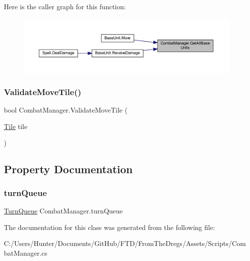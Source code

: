 Here is the caller graph for this function\+:
\nopagebreak
\begin{figure}[H]
\begin{center}
\leavevmode
\includegraphics[width=350pt]{class_combat_manager_a02eb44e3f4fab4f210d4ecda54fa1272_icgraph}
\end{center}
\end{figure}
\mbox{\label{class_combat_manager_a6f648795292255b600e92eefcf960ded}} 
\subsubsection{\texorpdfstring{ValidateMoveTile()}{ValidateMoveTile()}}
{\footnotesize\ttfamily bool Combat\+Manager.\+Validate\+Move\+Tile (\begin{DoxyParamCaption}\item[{\mbox{\hyperlink{class_tile}{Tile}}}]{tile }\end{DoxyParamCaption})}



\subsection{Property Documentation}
\mbox{\label{class_combat_manager_a6316ac49fbaf2e16426313d12749761d}} 
\subsubsection{\texorpdfstring{turnQueue}{turnQueue}}
{\footnotesize\ttfamily \mbox{\hyperlink{class_turn_queue}{Turn\+Queue}} Combat\+Manager.\+turn\+Queue\hspace{0.3cm}{\ttfamily [get]}}



The documentation for this class was generated from the following file\+:\begin{DoxyCompactItemize}
\item 
C\+:/\+Users/\+Hunter/\+Documents/\+Git\+Hub/\+F\+T\+D/\+From\+The\+Dregs/\+Assets/\+Scripts/Combat\+Manager.\+cs\end{DoxyCompactItemize}

